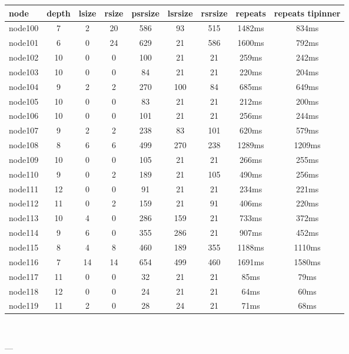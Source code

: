 \begin{tabular}{|l|c|c|c|c|c|c|c|c|}
\hline node & depth & lsize & rsize & psrsize & lsrsize & rsrsize   & repeats & repeats tipinner\\
    \hline node100 & 7 & 2 & 20 & 586 & 93 & 515 & 1482ms & 834ms\\
    \hline node101 & 6 & 0 & 24 & 629 & 21 & 586 & 1600ms & 792ms\\
    \hline node102 & 10 & 0 & 0 & 100 & 21 & 21 & 259ms & 242ms\\
    \hline node103 & 10 & 0 & 0 & 84 & 21 & 21 & 220ms & 204ms\\
    \hline node104 & 9 & 2 & 2 & 270 & 100 & 84 & 685ms & 649ms\\
    \hline node105 & 10 & 0 & 0 & 83 & 21 & 21 & 212ms & 200ms\\
    \hline node106 & 10 & 0 & 0 & 101 & 21 & 21 & 256ms & 244ms\\
    \hline node107 & 9 & 2 & 2 & 238 & 83 & 101 & 620ms & 579ms\\
    \hline node108 & 8 & 6 & 6 & 499 & 270 & 238 & 1289ms & 1209ms\\
    \hline node109 & 10 & 0 & 0 & 105 & 21 & 21 & 266ms & 255ms\\
    \hline node110 & 9 & 0 & 2 & 189 & 21 & 105 & 490ms & 256ms\\
    \hline node111 & 12 & 0 & 0 & 91 & 21 & 21 & 234ms & 221ms\\
    \hline node112 & 11 & 0 & 2 & 159 & 21 & 91 & 406ms & 220ms\\
    \hline node113 & 10 & 4 & 0 & 286 & 159 & 21 & 733ms & 372ms\\
    \hline node114 & 9 & 6 & 0 & 355 & 286 & 21 & 907ms & 452ms\\
    \hline node115 & 8 & 4 & 8 & 460 & 189 & 355 & 1188ms & 1110ms\\
    \hline node116 & 7 & 14 & 14 & 654 & 499 & 460 & 1691ms & 1580ms\\
    \hline node117 & 11 & 0 & 0 & 32 & 21 & 21 & 85ms & 79ms\\
    \hline node118 & 12 & 0 & 0 & 24 & 21 & 21 & 64ms & 60ms\\
    \hline node119 & 11 & 2 & 0 & 28 & 24 & 21 & 71ms & 68ms\\

\hline
\end{tabular} \

---


